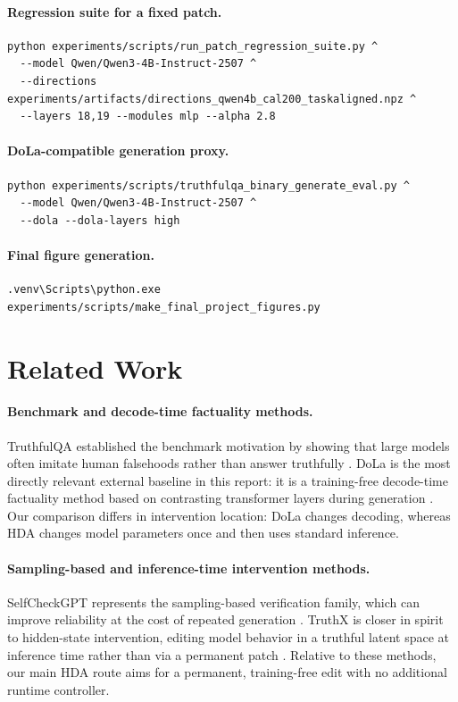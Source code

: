 \documentclass{article}
\begin{document}
\paragraph{Regression suite for a fixed patch.}
\begin{verbatim}
python experiments/scripts/run_patch_regression_suite.py ^
  --model Qwen/Qwen3-4B-Instruct-2507 ^
  --directions experiments/artifacts/directions_qwen4b_cal200_taskaligned.npz ^
  --layers 18,19 --modules mlp --alpha 2.8
\end{verbatim}

\paragraph{DoLa-compatible generation proxy.}
\begin{verbatim}
python experiments/scripts/truthfulqa_binary_generate_eval.py ^
  --model Qwen/Qwen3-4B-Instruct-2507 ^
  --dola --dola-layers high
\end{verbatim}

\paragraph{Final figure generation.}
\begin{verbatim}
.venv\Scripts\python.exe experiments/scripts/make_final_project_figures.py
\end{verbatim}

\section{Related Work}
\paragraph{Benchmark and decode-time factuality methods.}
TruthfulQA established the benchmark motivation by showing that large models often imitate human falsehoods rather than answer truthfully \citep{lin-etal-2022-truthfulqa}. DoLa is the most directly relevant external baseline in this report: it is a training-free decode-time factuality method based on contrasting transformer layers during generation \citep{chuang2024dola}. Our comparison differs in intervention location: DoLa changes decoding, whereas HDA changes model parameters once and then uses standard inference.

\paragraph{Sampling-based and inference-time intervention methods.}
SelfCheckGPT represents the sampling-based verification family, which can improve reliability at the cost of repeated generation \citep{manakul-etal-2023-selfcheckgpt}. TruthX is closer in spirit to hidden-state intervention, editing model behavior in a truthful latent space at inference time rather than via a permanent patch \citep{zhang-etal-2024-truthx}. Relative to these methods, our main HDA route aims for a permanent, training-free edit with no additional runtime controller.
\end{document}
